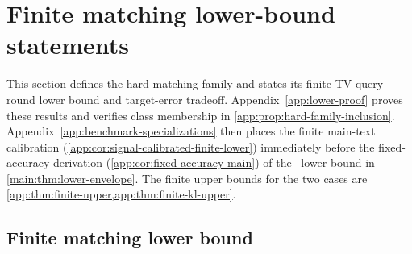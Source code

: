 \section{Finite matching lower-bound statements}
\label{app:results}

This section defines the hard matching family and states its finite TV
query--round lower bound and target-error tradeoff.
Appendix~\ref{app:lower-proof} proves these results and verifies class
membership in \cref{app:prop:hard-family-inclusion}.
Appendix~\ref{app:benchmark-specializations} then places the finite
main-text calibration (\cref{app:cor:signal-calibrated-finite-lower})
immediately before the fixed-accuracy derivation
(\cref{app:cor:fixed-accuracy-main}) of the \HellingerCase\ lower bound
in \cref{main:thm:lower-envelope}.
The finite upper bounds for the two cases are
\cref{app:thm:finite-upper,app:thm:finite-kl-upper}.

\subsection{Finite matching lower bound}
\label{app:results-lower}

